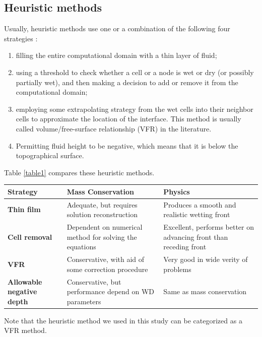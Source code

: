 \documentclass[review]{elsarticle}
\begin{document}
\subsection{  Heuristic methods} \label{Heuristic}
Usually, heuristic methods use one or a combination of the following four strategies \cite{Medeiros2013}: 
\begin{enumerate}
        \item filling the entire computational domain with a thin layer of fluid;
        \item using a threshold to check whether a cell or a node is wet or dry 
         (or possibly partially wet), and then  making a decision to add or remove it 
         from the computational domain;
        \item employing some extrapolating strategy from the wet cells into their neighbor 
         cells to approximate the location of the interface. This method is usually called 
         volume/free-surface relationship (VFR) in the literature.
        \item Permitting fluid height to be negative, which means that it is below the topographical surface.
\end{enumerate}
Table \ref{table1} compares these heuristic methods.
\begin{center}\label{table1}
        \begin{tabular}{|p{}|p{}|p{}|}
                \hline
                {\bf Strategy}                  & {\bf Mass Conservation}                                          & {\bf Physics} \\
                \hline
                {\bf Thin film}                 & Adequate, but requires solution reconstruction 
                & Produces a smooth and realistic wetting front     \\
                \hline 
                {\bf Cell removal}              & Dependent on numerical method for solving the equations          & Excellent, performs better on advancing front than receding front \\
                \hline
                {\bf VFR}                       & Conservative, with aid of some correction procedure              & Very good in wide verity of problems      \\
                \hline
                {\bf Allowable negative depth}  & Conservative, but performance depend on WD parameters            & Same as mass conservation      \\
                \hline
        \end{tabular}
\end{center}
Note that the heuristic method we used in this study can be categorized as a VFR method. 
\end{document}

